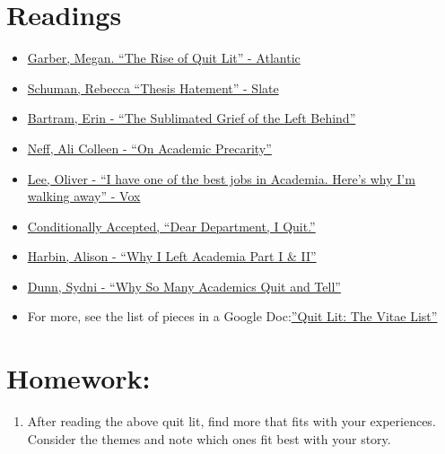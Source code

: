 \documentclass[]{book}
\providecommand{\tightlist}{%
  \setlength{\itemsep}{0pt}\setlength{\parskip}{0pt}}
\begin{document}
\section{Readings}\label{readings}

\begin{itemize}
\tightlist
\item
  \href{https://www.theatlantic.com/entertainment/archive/2015/09/dont-quit-your-day-job/404671/}{Garber,
  Megan. ``The Rise of Quit Lit'' - Atlantic}
\item
  \href{http://www.slate.com/articles/life/culturebox/2013/04/there_are_no_academic_jobs_and_getting_a_ph_d_will_make_you_into_a_horrible.html}{Schuman,
  Rebecca ``Thesis Hatement'' - Slate}
\item
  \href{http://erinbartram.com/uncategorized/the-sublimated-grief-of-the-left-behind/}{Bartram,
  Erin - ``The Sublimated Grief of the Left Behind''}
\item
  \href{http://www.alicolleenneff.com/blog/2017/11/8/on-academic-precarity}{Neff,
  Ali Colleen - ``On Academic Precarity''}
\item
  \href{\%20https://www.vox.com/2015/9/8/9261531/professor-quitting-job}{Lee,
  Oliver - ``I have one of the best jobs in Academia. Here's why I'm
  walking away'' - Vox}
\item
  \href{\%20https://conditionallyaccepted.com/2015/06/16/quit/}{Conditionally
  Accepted, ``Dear Department, I Quit.''}
\item
  \href{\%20https://www.allisonharbin.com/post-phd/why-i-left-academia-part-1}{Harbin,
  Alison - ``Why I Left Academia Part I \& II''}
\item
  \href{https://chroniclevitae.com/news/216-why-so-many-academics-quit-and-tell}{Dunn,
  Sydni - ``Why So Many Academics Quit and Tell''}
\item
  For more, see the list of pieces in a Google
  Doc:\href{\%20https://docs.google.com/spreadsheets/d/1OODoiZKeAtiGiI3IAONCspryCHWo5Yw9xkQzkRntuMU/edit\#gid=0}{''Quit
  Lit: The Vitae List''}
\end{itemize}

\section{Homework:}\label{homework}

\begin{enumerate}
\def\labelenumi{\arabic{enumi})}
\tightlist
\item
  After reading the above quit lit, find more that fits with your
  experiences. Consider the themes and note which ones fit best with
  your story.
\end{enumerate}
\end{document}
